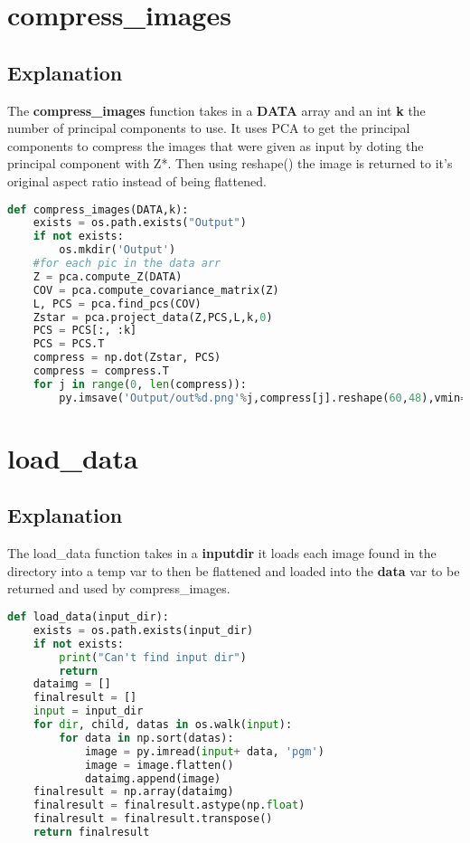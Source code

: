 \documentclass{article}
\begin{document}
\section{compress\_images}
\subsection{Explanation}
The \textbf{compress\_images} function takes in a \textbf{DATA} array and an int \textbf{k} the number of principal components to use. It uses PCA to get the principal components to compress the images that were given as input by doting the principal component with Z*. Then using reshape() the image is returned to it's original aspect ratio instead of being flattened. 
\begin{lstlisting}[language=Python]
def compress_images(DATA,k):
    exists = os.path.exists("Output")
    if not exists:
        os.mkdir('Output')
    #for each pic in the data arr
    Z = pca.compute_Z(DATA)
    COV = pca.compute_covariance_matrix(Z)
    L, PCS = pca.find_pcs(COV)
    Zstar = pca.project_data(Z,PCS,L,k,0)
    PCS = PCS[:, :k]
    PCS = PCS.T
    compress = np.dot(Zstar, PCS)
    compress = compress.T
    for j in range(0, len(compress)):
        py.imsave('Output/out%d.png'%j,compress[j].reshape(60,48),vmin=0,vmax=255,cmap='gray',format='png')
\end{lstlisting}

\section{load\_data}
\subsection{Explanation}
The load\_data function takes in a \textbf{inputdir} it loads each image found in the directory into a temp var to then be flattened and loaded into the \textbf{data} var to be returned and used by compress\_images.

\begin{lstlisting}[language=Python]
def load_data(input_dir):
    exists = os.path.exists(input_dir)
    if not exists:
        print("Can't find input dir")
        return 
    dataimg = []
    finalresult = []
    input = input_dir
    for dir, child, datas in os.walk(input):
        for data in np.sort(datas):
            image = py.imread(input+ data, 'pgm')
            image = image.flatten()
            dataimg.append(image)
    finalresult = np.array(dataimg)
    finalresult = finalresult.astype(np.float)
    finalresult = finalresult.transpose()
    return finalresult
\end{lstlisting}
\end{document}
